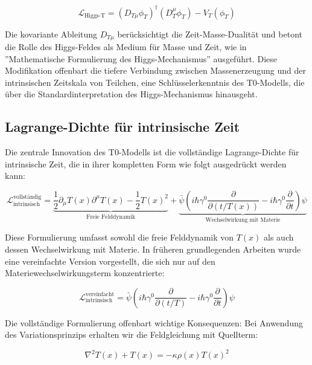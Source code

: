 \documentclass[a4paper,12pt]{article}
\newcommand{\Tfield}{T(x)}
\begin{document}
	\begin{equation}
		\mathcal{L}_\text{Higgs-T} = (D_{T\mu} \phi_T)^\dagger (D_T^\mu \phi_T) - V_T(\phi_T)
	\end{equation}
	
	Die kovariante Ableitung \(D_{T\mu}\) berücksichtigt die Zeit-Masse-Dualität und betont die Rolle des Higgs-Feldes als Medium für Masse und Zeit, wie in ''Mathematische Formulierung des Higgs-Mechanismus'' \cite{pascher_higgs_2025} ausgeführt. Diese Modifikation offenbart die tiefere Verbindung zwischen Massenerzeugung und der intrinsischen Zeitskala von Teilchen, eine Schlüsselerkenntnis des T0-Modells, die über die Standardinterpretation des Higgs-Mechanismus hinausgeht.
	\subsection{Lagrange-Dichte für intrinsische Zeit}
	
	Die zentrale Innovation des T0-Modells ist die vollständige Lagrange-Dichte für intrinsische Zeit, die in ihrer kompletten Form wie folgt ausgedrückt werden kann:
	
	\begin{equation}
		\mathcal{L}_{\text{intrinsisch}}^{\text{vollständig}} = \underbrace{\frac{1}{2} \partial_\mu \Tfield \partial^\mu \Tfield - \frac{1}{2}\Tfield^2}_{\text{Freie Felddynamik}} + \underbrace{\bar{\psi} \left( i\hbar \gamma^0 \frac{\partial}{\partial (t/\Tfield)} - i\hbar \gamma^0 \frac{\partial}{\partial t} \right) \psi}_{\text{Wechselwirkung mit Materie}}
	\end{equation}
	
	Diese Formulierung umfasst sowohl die freie Felddynamik von \(\Tfield\) als auch dessen Wechselwirkung mit Materie. In früheren grundlegenden Arbeiten wurde eine vereinfachte Version vorgestellt, die sich nur auf den Materiewechselwirkungsterm konzentrierte:
	
	\begin{equation}
		\mathcal{L}_\text{intrinsisch}^{\text{vereinfacht}} = \bar{\psi} \left( i\hbar \gamma^0 \frac{\partial}{\partial (t/T)} - i\hbar \gamma^0 \frac{\partial}{\partial t} \right) \psi
	\end{equation}
	
	Die vollständige Formulierung offenbart wichtige Konsequenzen: Bei Anwendung des Variationsprinzips erhalten wir die Feldgleichung mit Quellterm:
	
	\begin{equation}
		\nabla^2 \Tfield + \Tfield = -\kappa\rho(x)\Tfield^2
	\end{equation}
	
\end{document}

